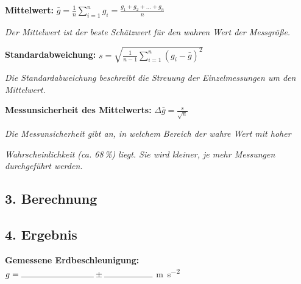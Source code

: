 \documentclass[11pt,a4paper]{scrartcl}
\begin{document}
	\begin{infobox}[title={\faIcon{info-circle} Berechnung der Messunsicherheit}]
		\textbf{Mittelwert:} \quad $\displaystyle \bar{g} = \frac{1}{n} \sum_{i=1}^{n} g_i = \frac{g_1 + g_2 + \ldots + g_n}{n}$
		
		\hspace{1cm}\textit{Der Mittelwert ist der beste Schätzwert für den wahren Wert der Messgröße.}
		
		\vspace{0.3cm}
		\textbf{Standardabweichung:} \quad $\displaystyle s = \sqrt{\frac{1}{n-1} \sum_{i=1}^{n} (g_i - \bar{g})^2}$
		
		\hspace{1cm}\textit{Die Standardabweichung beschreibt die Streuung der Einzelmessungen um den Mittelwert.}
		
		\vspace{0.3cm}
		\textbf{Messunsicherheit des Mittelwerts:} \quad $\displaystyle \Delta \bar{g} = \frac{s}{\sqrt{n}}$
		
		\hspace{1cm}\textit{Die Messunsicherheit gibt an, in welchem Bereich der wahre Wert mit hoher}
		
		\hspace{1cm}\textit{Wahrscheinlichkeit (ca. 68\,\%) liegt. Sie wird kleiner, je mehr Messungen durchgeführt werden.}
	\end{infobox}
	
	\newpage
	
	\subsection*{3. Berechnung}
	
	\vspace{5cm}
	
	\subsection*{4. Ergebnis}
	
	\begin{center}
		\begin{tcolorbox}[colback=yellow!10!white, colframe=yellow!50!black, width=0.9\textwidth]
			\centering
			\textbf{Gemessene Erdbeschleunigung:}\\[0.4cm]
			{\Large $g = \rule{3cm}{0.4pt} \pm \rule{2cm}{0.4pt}$ \si{\metre\per\second\squared}}
		\end{tcolorbox}
	\end{center}
	
\end{document}
